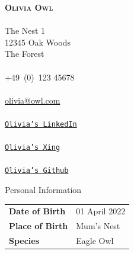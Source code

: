 \documentclass[darkstylish]{stylishcv} %
\begin{document}
		\begin{center}
			{\bfseries \scshape Olivia Owl}\\[\baselineskip]
			{\color{accentcolor}{\faMapMarker}}\\The Nest 1\\12345 Oak Woods\\The Forest\\[\baselineskip]
			{\color{accentcolor}{\faMobile}}\\+49~(0)~123 45678\\[\baselineskip]
			{\color{accentcolor}{\faEnvelopeO}}\\\href{mailto:olivia@owl.com}{olivia@owl.com}\\[\baselineskip]
			{\color{accentcolor}{\faLinkedinSquare}}\\\href{http://linkedin.com}{\texttt{Olivia's LinkedIn}}\\[\baselineskip]
			{\color{accentcolor}{\faXingSquare}}\\\href{http://xing.de}{\texttt{Olivia's Xing}}\\[\baselineskip]
			{\color{accentcolor}{\faGithubSquare}}\\\href{https://github.com/}{\texttt{Olivia's Github}}\\[\baselineskip]

			\vspace{0.25cm}
			\dottedsidebarline
			\vspace{0.5cm}
		\end{center}


		\begin{center}
			\begin{darkshadedcvbox}Personal Information\end{darkshadedcvbox}
		\end{center}
		\begin{tabular}{L{1.35cm}  R{2.05cm}}
			\hspace{-0.45cm}\textbf{Date of Birth}& 01 April 2022\\
			\hspace{-0.45cm}\textbf{Place of Birth} & Mum's Nest\\
			\hspace{-0.45cm}\textbf{Species} & Eagle Owl\\
		\end{tabular}
		\smallskip
\end{document}

